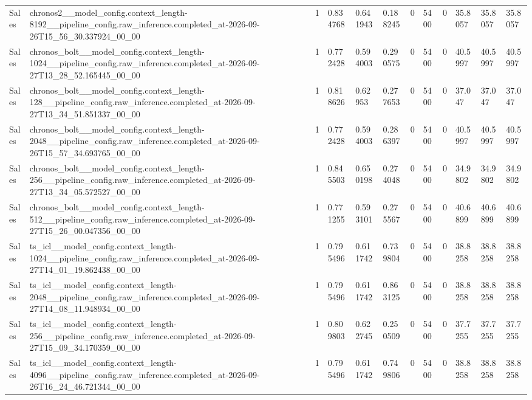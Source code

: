 \begin{tabular}{llllllllllll}
Sales & chronos2\_\_model\_config.context\_length-8192\_\_pipeline\_config.raw\_inference.completed\_at-2026-09-26T15\_56\_30.337924\_00\_00 & 1 & 0.834768 & 0.641943 & 0.188245 & 0 & 5400 & 0 & 35.8057 & 35.8057 & 35.8057 \\
Sales & chronos\_bolt\_\_model\_config.context\_length-1024\_\_pipeline\_config.raw\_inference.completed\_at-2026-09-27T13\_28\_52.165445\_00\_00 & 1 & 0.772428 & 0.594003 & 0.290575 & 0 & 5400 & 0 & 40.5997 & 40.5997 & 40.5997 \\
Sales & chronos\_bolt\_\_model\_config.context\_length-128\_\_pipeline\_config.raw\_inference.completed\_at-2026-09-27T13\_34\_51.851337\_00\_00 & 1 & 0.818626 & 0.62953 & 0.277653 & 0 & 5400 & 0 & 37.047 & 37.047 & 37.047 \\
Sales & chronos\_bolt\_\_model\_config.context\_length-2048\_\_pipeline\_config.raw\_inference.completed\_at-2026-09-26T15\_57\_34.693765\_00\_00 & 1 & 0.772428 & 0.594003 & 0.286397 & 0 & 5400 & 0 & 40.5997 & 40.5997 & 40.5997 \\
Sales & chronos\_bolt\_\_model\_config.context\_length-256\_\_pipeline\_config.raw\_inference.completed\_at-2026-09-27T13\_34\_05.572527\_00\_00 & 1 & 0.845503 & 0.650198 & 0.274048 & 0 & 5400 & 0 & 34.9802 & 34.9802 & 34.9802 \\
Sales & chronos\_bolt\_\_model\_config.context\_length-512\_\_pipeline\_config.raw\_inference.completed\_at-2026-09-27T15\_26\_00.047356\_00\_00 & 1 & 0.771255 & 0.593101 & 0.275567 & 0 & 5400 & 0 & 40.6899 & 40.6899 & 40.6899 \\
Sales & ts\_icl\_\_model\_config.context\_length-1024\_\_pipeline\_config.raw\_inference.completed\_at-2026-09-27T14\_01\_19.862438\_00\_00 & 1 & 0.795496 & 0.611742 & 0.739804 & 0 & 5400 & 0 & 38.8258 & 38.8258 & 38.8258 \\
Sales & ts\_icl\_\_model\_config.context\_length-2048\_\_pipeline\_config.raw\_inference.completed\_at-2026-09-27T14\_08\_11.948934\_00\_00 & 1 & 0.795496 & 0.611742 & 0.863125 & 0 & 5400 & 0 & 38.8258 & 38.8258 & 38.8258 \\
Sales & ts\_icl\_\_model\_config.context\_length-256\_\_pipeline\_config.raw\_inference.completed\_at-2026-09-27T15\_09\_34.170359\_00\_00 & 1 & 0.809803 & 0.622745 & 0.250509 & 0 & 5400 & 0 & 37.7255 & 37.7255 & 37.7255 \\
Sales & ts\_icl\_\_model\_config.context\_length-4096\_\_pipeline\_config.raw\_inference.completed\_at-2026-09-26T16\_24\_46.721344\_00\_00 & 1 & 0.795496 & 0.611742 & 0.749806 & 0 & 5400 & 0 & 38.8258 & 38.8258 & 38.8258 \\

\end{tabular}
